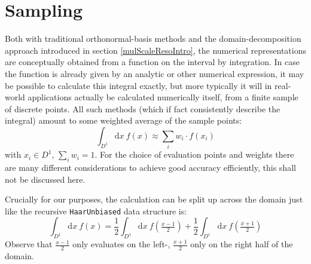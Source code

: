 \documentclass[sigplan,review,anonymous]{acmart}\settopmatter{printfolios=true,printccs=false,printacmref=false}
\begin{document}
\section{Sampling}
Both with traditional orthonormal-basis methods and the domain-decomposition approach introduced in section \ref{mulScaleResoIntro}, the numerical representations are conceptually obtained from a function on the interval by integration. In case the function is already given by an analytic or other numerical expression, it may be possible to calculate this integral exactly, but more typically it will in real-world applications actually be calculated numerically itself, from a finite sample of discrete points. All such methods (which if fact consistently describe the integral) amount to some weighted average of the sample points:
\[
  \int_{D^1}\!\mathrm{d}x\:f(x) \approx \sum_i w_i\cdot f(x_i)
\]
with $x_i\in D^1$, $\sum_i w_i = 1$. For the choice of evaluation points and weights there are many different considerations to achieve good accuracy efficiently, this shall not be discussed here.

Crucially for our purposes, the calculation can be split up across the domain just like the recursive \lstinline`HaarUnbiased` data structure is:
\[
  \int_{D^1}\!\mathrm{d}x\:f(x)
    = \frac12\int_{D^1}\!\mathrm{d}x\:f(\tfrac{x-1}2)
    + \frac12\int_{D^1}\!\mathrm{d}x\:f(\tfrac{x+1}2)
\]
Observe that $\tfrac{x-1}2$ only evaluates on the left-, $\tfrac{x+1}2$ only on the right half of the domain.
\end{document}
